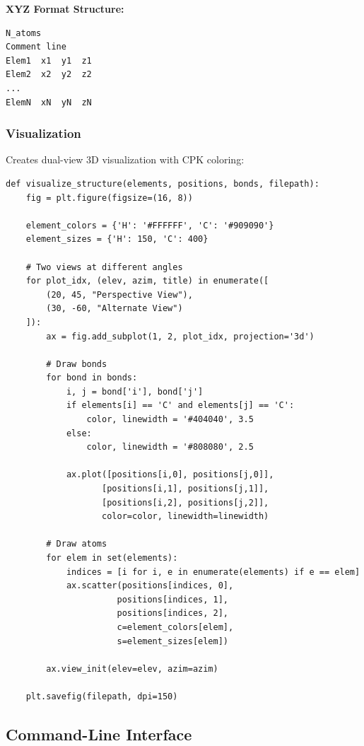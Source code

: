 \documentclass[11pt,a4paper]{article}
\begin{document}
\textbf{XYZ Format Structure:}
\begin{verbatim}
N_atoms
Comment line
Elem1  x1  y1  z1
Elem2  x2  y2  z2
...
ElemN  xN  yN  zN
\end{verbatim}

\subsubsection{Visualization}

Creates dual-view 3D visualization with CPK coloring:

\begin{lstlisting}[caption={3D Visualization (lines 111-173)}]
def visualize_structure(elements, positions, bonds, filepath):
    fig = plt.figure(figsize=(16, 8))

    element_colors = {'H': '#FFFFFF', 'C': '#909090'}
    element_sizes = {'H': 150, 'C': 400}

    # Two views at different angles
    for plot_idx, (elev, azim, title) in enumerate([
        (20, 45, "Perspective View"),
        (30, -60, "Alternate View")
    ]):
        ax = fig.add_subplot(1, 2, plot_idx, projection='3d')

        # Draw bonds
        for bond in bonds:
            i, j = bond['i'], bond['j']
            if elements[i] == 'C' and elements[j] == 'C':
                color, linewidth = '#404040', 3.5
            else:
                color, linewidth = '#808080', 2.5

            ax.plot([positions[i,0], positions[j,0]],
                   [positions[i,1], positions[j,1]],
                   [positions[i,2], positions[j,2]],
                   color=color, linewidth=linewidth)

        # Draw atoms
        for elem in set(elements):
            indices = [i for i, e in enumerate(elements) if e == elem]
            ax.scatter(positions[indices, 0],
                      positions[indices, 1],
                      positions[indices, 2],
                      c=element_colors[elem],
                      s=element_sizes[elem])

        ax.view_init(elev=elev, azim=azim)

    plt.savefig(filepath, dpi=150)
\end{lstlisting}

\subsection{Command-Line Interface}
\end{document}
